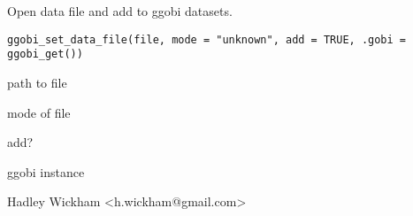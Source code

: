 \begin{Description}\relax
Open data file and add to ggobi datasets.
\end{Description}
\begin{Usage}
\begin{verbatim}ggobi_set_data_file(file, mode = "unknown", add = TRUE, .gobi = ggobi_get())\end{verbatim}
\end{Usage}
\begin{Arguments}
\begin{ldescription}
\item[\code{file}] path to file
\item[\code{mode}] mode of file
\item[\code{add}] add?
\item[\code{.gobi}] ggobi instance
\end{ldescription}
\end{Arguments}
\begin{Details}\relax
\end{Details}
\begin{Author}\relax
Hadley Wickham <h.wickham@gmail.com>
\end{Author}
\begin{Examples}
\begin{ExampleCode}\end{ExampleCode}
\end{Examples}

